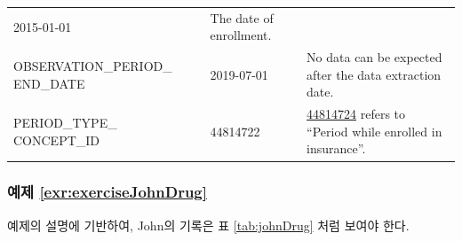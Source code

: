 \documentclass[11pt]{book}
\theoremstyle{definition}
\theoremstyle{definition}
\theoremstyle{definition}
\theoremstyle{remark}
\begin{document}
\begin{longtable}[]{@{}lll@{}}
\begin{minipage}[t]{0.14\columnwidth}
2015-01-01\strut
\end{minipage} & \begin{minipage}[t]{0.48\columnwidth}\raggedright\strut
The date of enrollment.\strut
\end{minipage}\tabularnewline
\begin{minipage}[t]{0.29\columnwidth}\raggedright\strut
OBSERVATION\_PERIOD\_ END\_DATE\strut
\end{minipage} & \begin{minipage}[t]{0.14\columnwidth}\raggedright\strut
2019-07-01\strut
\end{minipage} & \begin{minipage}[t]{0.48\columnwidth}\raggedright\strut
No data can be expected after the data extraction date.\strut
\end{minipage}\tabularnewline
\begin{minipage}[t]{0.29\columnwidth}\raggedright\strut
PERIOD\_TYPE\_ CONCEPT\_ID\strut
\end{minipage} & \begin{minipage}[t]{0.14\columnwidth}\raggedright\strut
44814722\strut
\end{minipage} & \begin{minipage}[t]{0.48\columnwidth}\raggedright\strut
\href{http://athena.ohdsi.org/search-terms/terms/44814722}{44814724}
refers to ``Period while enrolled in insurance''.\strut
\end{minipage}\tabularnewline
\bottomrule
\end{longtable}

\subsubsection*{예제
\ref{exr:exerciseJohnDrug}}\label{-refexrexercisejohndrug}

예제의 설명에 기반하여, John의 기록은 표 \ref{tab:johnDrug} 처럼 보여야
한다.
\end{document}
